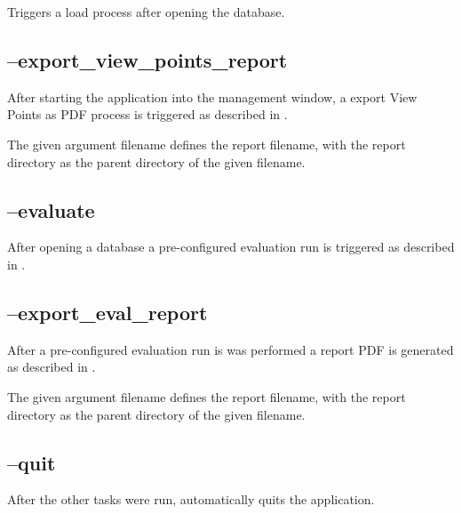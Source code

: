 Triggers a load process after opening the database.

\subsection{--export\_view\_points\_report}

After starting the application into the management window, a export View Points as PDF process is triggered as described in
.

The given argument filename defines the report filename, with the report directory as the parent directory of the given filename.

\subsection{--evaluate}

After opening a database a pre-configured evaluation run is triggered as described in .

\subsection{--export\_eval\_report}

After a pre-configured evaluation run is was performed a report PDF is generated as described in .

The given argument filename defines the report filename, with the report directory as the parent directory of the given filename.

\subsection{--quit}

After the other tasks were run, automatically quits the application.


